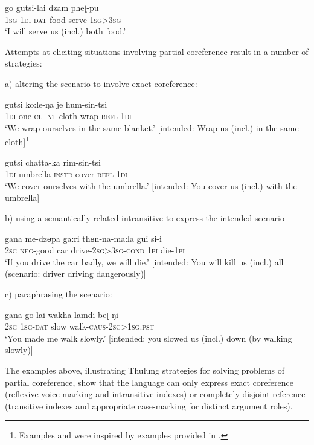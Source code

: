 \documentclass[output=paper]{langscibook}
\begin{document}
\ea%
    \label{ex:Lahaussois:42}
    \gll go gutsi-lai dzam pheʈ-pu\\
        \textsc{1sg} \textsc{1di-dat} food serve-\textsc{1sg>3sg}\\
    \glt ‘I will serve us (incl.) both food.'
    \z

Attempts at eliciting situations involving partial coreference result in a number of strategies:

a) altering the scenario to involve exact coreference: 

\ea%
    \label{ex:Lahaussois:43}
    \gll gutsi ko:le-ŋa je hum-sin-tsi\\
        \textsc{1di} one-\textsc{cl-int} cloth wrap-\textsc{refl-1di}\\
    \glt ‘We wrap ourselves in the same blanket.' [intended: Wrap us (incl.) in the same cloth]\footnote{Examples  and  were inspired by examples provided in \citet{BickelEtAl2010}.}
    \z


\ea%
    \label{ex:Lahaussois:44}
    \gll gutsi chatta-ka rim-sin-tsi\\
        \textsc{1di} umbrella-\textsc{instr} cover-\textsc{refl-1di}\\
    \glt ‘We cover ourselves with the umbrella.' [intended: You cover us (incl.) with the umbrella]
    \z


b) using a semantically-related intransitive to express the intended scenario

\ea%
    \label{ex:Lahaussois:45}
    \gll gana me-dzɵpa ga:ri thɵn-na-ma:la gui si-i\\
        \textsc{2sg} \textsc{neg}{}-good car drive-\textsc{2sg>3sg-cond} \textsc{1pi} die-\textsc{1pi}\\
    \glt ‘If you drive the car badly, we will die.' [intended: You will kill us (incl.) all (scenario: driver driving dangerously)]
    \z

c) paraphrasing the scenario:

\ea%
    \label{ex:Lahaussois:46}
    \gll gana go-lai wakha lamdi-beʈ-ŋi\\
        \textsc{2sg} \textsc{1sg-dat} slow walk-\textsc{caus-2sg>1sg.pst}\\
    \glt ‘You made me walk slowly.' [intended: you slowed us (incl.) down (by walking slowly)]
    \z

The examples above, illustrating Thulung strategies for solving problems of partial coreference, show that the language can only express exact coreference (reflexive voice marking and intransitive indexes) or completely disjoint reference (transitive indexes and appropriate case-marking for distinct argument roles). 
\end{document}
